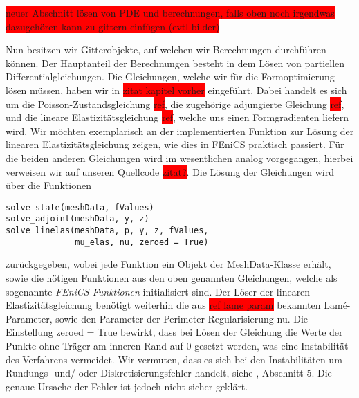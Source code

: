 \documentclass[bibliography=totoc,12pt,a4paper]{scrartcl}
\theoremstyle{exampstyle}
\numberwithin{equation}{section}
\begin{document}
\colorbox{red}{neuer Abschnitt lösen von PDE und berechnungen, falls oben noch irgendwas dazugehören kann zu gittern einfügen (evtl bilder)}

Nun besitzen wir Gitterobjekte, auf welchen wir Berechnungen durchführen können. Der Hauptanteil der Berechnungen besteht in dem Lösen von partiellen Differentialgleichungen. Die Gleichungen, welche wir für die Formoptimierung lösen müssen, haben wir in \colorbox{red}{zitat kapitel vorher} eingeführt. Dabei handelt es sich um die Poisson-Zustandsgleichung \colorbox{red}{ref}, die zugehörige adjungierte Gleichung \colorbox{red}{ref}, und die lineare Elastizitätsgleichung \colorbox{red}{ref}, welche uns einen Formgradienten liefern wird. Wir möchten exemplarisch an der implementierten Funktion zur Lösung der linearen Elastizitätsgleichung zeigen, wie dies in FEniCS praktisch passiert. Für die beiden anderen Gleichungen wird im wesentlichen analog vorgegangen, hierbei verweisen wir auf unseren Quellcode \colorbox{red}{zitat?}. Die Lösung der Gleichungen wird über die Funktionen 
\begin{lstlisting}
solve_state(meshData, fValues)
solve_adjoint(meshData, y, z)
solve_linelas(meshData, p, y, z, fValues, 
	          mu_elas, nu, zeroed = True)
\end{lstlisting}
zurückgegeben, wobei jede Funktion ein Objekt der \textsf{MeshData}-Klasse erhält, sowie die nötigen Funktionen aus den oben genannten Gleichungen, welche als sogenannte \textit{FEniCS-Funktionen} initialisiert sind. Der Löser der linearen Elastizitätsgleichung benötigt weiterhin die aus \colorbox{red}{ref lame param} bekannten Lamé-Parameter, sowie den Parameter der Perimeter-Regularisierung \textsf{nu}. Die Einstellung \textsf{zeroed = True} bewirkt, dass bei Lösen der Gleichung die Werte der Punkte ohne Träger am inneren Rand auf 0 gesetzt werden, was eine Instabilität des Verfahrens vermeidet. Wir vermuten, dass es sich bei den Instabilitäten um Rundungs- und/ oder Diskretisierungsfehler handelt, siehe \cite{bfgs1}, Abschnitt 5. Die genaue Ursache der Fehler ist jedoch nicht sicher geklärt. 
\end{document}
